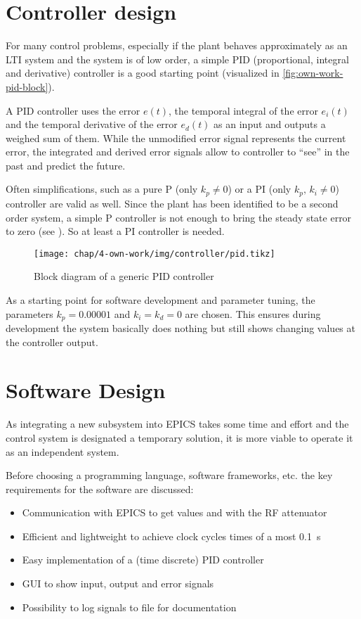 \section{Controller design}
For many control problems, especially if the plant behaves approximately as an LTI system and the system is of low order, a simple PID (proportional, integral and derivative) controller is a good starting point (visualized in \autoref{fig:own-work-pid-block}). 

A PID controller uses the error $e(t)$, the temporal integral of the error $e_i(t)$ and the temporal derivative of the error $e_d(t)$ as an input and outputs a weighed sum of them. While the unmodified error signal represents the current error, the integrated and derived error signals allow to controller to ``see'' in the past and predict the future.

Often simplifications, such as a pure P (only $k_p \neq 0$) or a PI (only $k_p,\,k_i \neq 0$) controller are valid as well. Since the plant has been identified to be a second order system, a simple P controller is not enough to bring the steady state error to zero (see ). So at least a PI controller is needed.

\begin{figure}[tb]
	\centering
	\texttt{[image: chap/4-own-work/img/controller/pid.tikz]}
	\caption{Block diagram of a generic PID controller}
	\label{fig:own-work-pid-block}
\end{figure}

As a starting point for software development and parameter tuning, the parameters $k_p=0.00001$ and $k_i=k_d=0$ are chosen. This ensures during development the system basically does nothing but still shows changing values at the controller output.

\FloatBarrier
\section{Software Design}
As integrating a new subsystem into EPICS takes some time and effort and the control system is designated a temporary solution, it is more viable to operate it as an independent system.

Before choosing a programming language, software frameworks, etc. the key requirements for the software are discussed:
\begin{itemize}
\item Communication with EPICS to get values and with the RF attenuator
\item Efficient and lightweight to achieve clock cycles times of a most \SI{0.1}{\second}
\item Easy implementation of a (time discrete) PID controller
\item GUI to show input, output and error signals
\item Possibility to log signals to file for documentation
\end{itemize}

